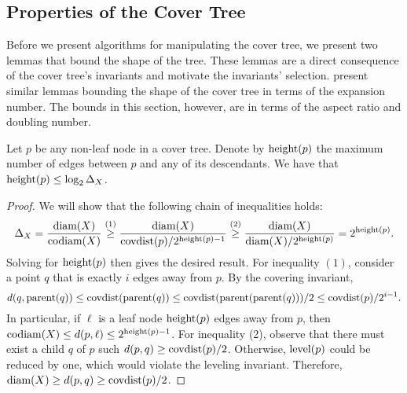 \documentclass[thesis.tex]{subfiles}
\newcommand{\dist}[2]{\distf({#1},{#2})}
\newcommand{\distf}{d}
\newcommand{\diam}[1]{\textnormal{diam}({#1})}
\newcommand{\codiam}[1]{\textnormal{codiam}({#1})}
\newcommand{\aspect}[1]{\Delta_{#1}}
\newcommand{\mkfunction}[1]{\ifmmode{\textnormal{{#1}}}}
\newcommand{\level}[1]      {\mkfunction{level}({#1})}
\newcommand{\parent}[1]     {\mkfunction{parent}({#1})}
\newcommand{\covdist}[1]    {\mkfunction{covdist}({#1})}
\newcommand{\maxdist}[1]    {\mkfunction{maxdist}({#1})}
\newcommand{\height}[1]     {\mkfunction{height}({#1})}
\begin{document}

\subsection{Properties of the Cover Tree}

Before we present algorithms for manipulating the cover tree, 
we present two lemmas that bound the shape of the tree.
These lemmas are a direct consequence of the cover tree's invariants and motivate the invariants' selection.
\citet{beygelzimer2006cover} present similar lemmas bounding the shape of the cover tree in terms of the expansion number.
The bounds in this section, however, are in terms of the aspect ratio and doubling number.


%


\begin{lemma}
    \label{lemma:height}
    Let $p$ be any non-leaf node in a cover tree.
    Denote by $\height{p}$ the maximum number of edges between $p$ and any of its descendants.
    We have that $\height{p} \le \log_2\aspect{X}$.
\end{lemma}

\begin{proof}
    We will show that the following chain of inequalities holds:
    \begin{equation}
        \aspect{X} 
        = \frac{\diam{X}}{\codiam{X}} 
        \overset{(1)}\ge \frac{\diam{X}}{\covdist{p}/2^{\height p-1}} 
        \overset{(2)}\ge \frac{\diam{X}}{\diam{X}/2^{\height p}} 
        = 2^{\height p}
        .
    \end{equation}
    Solving for $\height p$ then gives the desired result.
    For inequality $(1)$, consider a point $q$ that is exactly $i$ edges away from $p$.
    By the covering invariant, 
    \begin{equation}
        \dist{q}{\parent{q}} 
        \le 
        \covdist{\parent{q}}
        \le 
        \covdist{\parent{\parent{q}}}/2
        \le
        \covdist{p}/2^{i-1}
        .
    \end{equation}
    In particular, if $\ell$ is a leaf node $\height p$ edges away from $p$,
    then $\codiam{X}\le\dist{p}{\ell}\le2^{\height p-1}$.
    For inequality (2), observe that there must exist a child $q$ of $p$ such $\dist{p}{q} \ge \covdist{p}/2$.
    Otherwise, $\level p$ could be reduced by one, which would violate the leveling invariant.
    Therefore, $\diam{X} \ge \dist{p}{q} \ge \covdist{p}/2$.
\end{proof}
\end{document}
